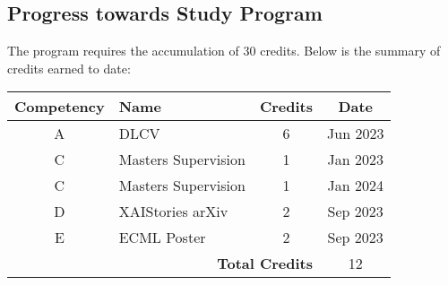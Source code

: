 \subsection*{Progress towards Study Program}
The program requires the accumulation of 30 credits. Below is the summary of credits earned to date:

\begin{tabular}{|c|l|c|c|}
    \hline
    \textbf{Competency} & \textbf{Name}             & \textbf{Credits} & \textbf{Date}   \\ \hline
    A                   & DLCV                      & 6                & Jun 2023         \\ \hline
    C                   & Masters Supervision       & 1                & Jan 2023        \\ \hline
    C                   & Masters Supervision       & 1                & Jan 2024        \\ \hline
    D                   & XAIStories arXiv          & 2                & Sep 2023        \\ \hline
    E                   & ECML Poster               & 2                 & Sep 2023       \\ \hline
    \multicolumn{3}{|r|}{\textbf{Total Credits}}   & 12               \\ \hline
\end{tabular}